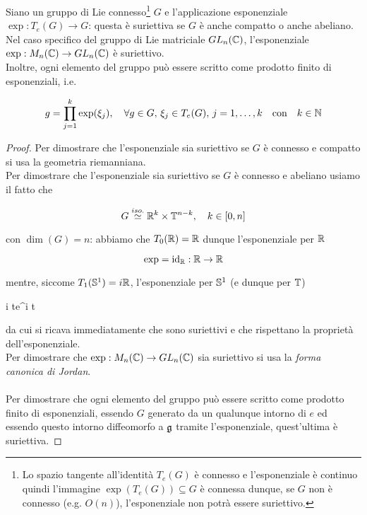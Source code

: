 \begin{theorem}
	Siano un gruppo di Lie connesso\footnote{%
		Lo spazio tangente all'identità $ T_{e}(G) $ è connesso e l'esponenziale è continuo quindi l'immagine $ \exp(T_{e}(G)) \subseteq G $ è connessa dunque, se $ G $ non è connesso (e.g. $ O(n) $), l'esponenziale non potrà essere suriettivo.%
	} $ G $ e l'applicazione esponenziale $ \exp : T_{e}(G) \to G $: questa è suriettiva se $ G $ è anche compatto o anche abeliano.\\
	Nel caso specifico del gruppo di Lie matriciale $ GL_{n}(\C) $, l'esponenziale $ \exp : M_{n}(\C) \to GL_{n}(\C) $ è suriettivo.\\
	Inoltre, ogni elemento del gruppo può essere scritto come prodotto finito di esponenziali, i.e. 

	\begin{equation}
		g = \prod_{j=1}^{k} \exp(\xi_{j}) \qcomma \forall g \in G, \, \xi_{j} \in T_{e}(G), \, j=1,\dots,k \qq{con} k \in \N
	\end{equation}
\end{theorem}

\begin{proof}
	Per dimostrare che l'esponenziale sia suriettivo se $ G $ è connesso e compatto si usa la geometria riemanniana.\\
	Per dimostrare che l'esponenziale sia suriettivo se $ G $ è connesso e abeliano usiamo il fatto che
	
	\begin{equation}
		G \stackrel{iso.}{\simeq} \R^{k} \times \T^{n-k} \qcomma k \in [0,n]
	\end{equation}

	con $ \dim(G) = n $: abbiamo che $ T_{0}(\R) = \R $ dunque l'esponenziale per $ \R $
	
	\begin{equation}
		\exp = \id_{\R} : \R \to \R
	\end{equation}

	mentre, siccome $ T_{1}(\S^{1}) = i \R $, l'esponenziale per $ \S^{1} $ (e dunque per $ \T $)
	
	\map{\exp}%
		{i \R}{\R}%
		{t}{e^{i t}}
		
	da cui si ricava immediatamente che sono suriettivi e che rispettano la proprietà dell'esponenziale.\\
	Per dimostrare che $ \exp : M_{n}(\C) \to GL_{n}(\C) $ sia suriettivo si usa la \textit{forma canonica di Jordan}.\\\\
	Per dimostrare che ogni elemento del gruppo può essere scritto come prodotto finito di esponenziali, essendo $ G $ generato da un qualunque intorno di $ e $ ed essendo questo intorno diffeomorfo a $ \g $ tramite l'esponenziale, quest'ultima è suriettiva.
\end{proof}

